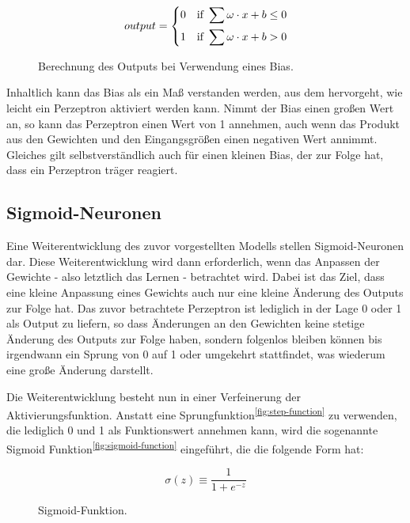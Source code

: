 \begin{figure}[h]
    \centering
    \[ output =
          \begin{dcases}
            0 \quad \text{if } \sum \omega \cdot x + b \leq 0 \\
            1 \quad \text{if } \sum \omega \cdot x + b > 0
          \end{dcases}
    \]
    \caption{Berechnung des Outputs bei Verwendung eines Bias.}
    \label{fig:bias-calculation}
\end{figure}

Inhaltlich kann das Bias als ein Maß verstanden werden, aus dem hervorgeht, wie leicht ein Perzeptron aktiviert
werden kann. Nimmt der Bias einen großen Wert an, so kann das Perzeptron einen Wert von 1 annehmen, auch wenn das
Produkt aus den Gewichten und den Eingangsgrößen einen negativen Wert annimmt. Gleiches gilt selbstverständlich auch für
einen kleinen Bias, der zur Folge hat, dass ein Perzeptron träger reagiert.

\subsection{Sigmoid-Neuronen}

Eine Weiterentwicklung des zuvor vorgestellten Modells stellen Sigmoid-Neuronen dar. Diese Weiterentwicklung wird
dann erforderlich, wenn das Anpassen der Gewichte - also letztlich das Lernen - betrachtet wird. Dabei ist das Ziel,
dass eine kleine Anpassung eines Gewichts auch nur eine kleine Änderung des Outputs zur Folge hat. Das zuvor
betrachtete Perzeptron ist lediglich in der Lage 0 oder 1 als Output zu liefern, so dass Änderungen an den Gewichten
keine stetige Änderung des Outputs zur Folge haben, sondern folgenlos bleiben können bis irgendwann ein Sprung von 0
auf 1 oder umgekehrt stattfindet, was wiederum eine große Änderung darstellt.

Die Weiterentwicklung besteht nun in einer Verfeinerung der Aktivierungsfunktion. Anstatt eine Sprungfunktion\textsuperscript{\ref{fig:step-function}} zu
verwenden, die lediglich 0 und 1 als Funktionswert annehmen kann, wird die sogenannte Sigmoid Funktion\textsuperscript{\ref{fig:sigmoid-function}} eingeführt,
die die folgende Form hat:

\begin{figure}[h]
    \centering
    \[ \sigma(z) \equiv
          \frac{1}{1+e^{-z}}
    \]
    \caption{Sigmoid-Funktion.}
    \label{fig:sigmoid}
\end{figure}

